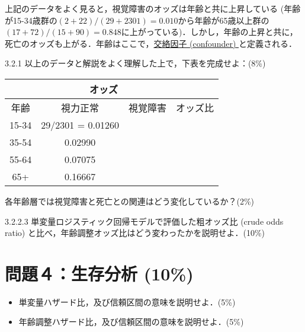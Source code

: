 \documentclass[11pt,]{problemset}
\providecommand{\tightlist}{%
  \setlength{\itemsep}{0pt}\setlength{\parskip}{0pt}}
\begin{document}
上記のデータをよく見ると，視覚障害のオッズは年齢と共に上昇している
(年齢が15-34歳群の\((2 + 22) / (29 + 2301) = 0.010\)から年齢が65歳以上群の\((17+72)/(15+90) = 0.848\)に上がっている)．しかし，年齢の上昇と共に，死亡のオッズも上がる．年齢はここで，\underline{交絡因子 (confounder) }と定義される．

3.2.1 以上のデータと解説をよく理解した上で，下表を完成せよ：(8\%)

\begin{center}
\begin{tabular}{|c|c|c|c|}
\hline
      & \multicolumn{2}{c|}{オッズ}    &        \\ \hline
年齢    & 視力正常              & 視覚障害    & オッズ比   \\ \hline
15-34 & 29/2301 = 0.01260 &   &   \\ \hline
35-54 & 0.02990           &  &  \\ \hline
55-64 & 0.07075           &  &  \\ \hline
65+   & 0.16667           &  &  \\ \hline
\end{tabular}
\end{center}

各年齢層では視覚障害と死亡との関連はどう変化しているか？(2\%)

\newpage

3.2.2.3 単変量ロジスティック回帰モデルで評価した粗オッズ比 (crude odds
ratio) と比べ，年齢調整オッズ比はどう変わったかを説明せよ．(10\%)

\bigskip\bigskip\bigskip\bigskip\bigskip
\bigskip\bigskip\bigskip\bigskip\bigskip
\bigskip\bigskip\bigskip\bigskip\bigskip

\hypertarget{-10}{%
\section{問題４：生存分析 (10\%)}\label{-10}}

\begin{itemize}
\tightlist
\item
  単変量ハザード比，及び信頼区間の意味を説明せよ．(5\%)
\end{itemize}

\bigskip\bigskip\bigskip\bigskip\bigskip
\bigskip\bigskip\bigskip\bigskip\bigskip
\bigskip\bigskip\bigskip\bigskip\bigskip

\begin{itemize}
\tightlist
\item
  年齢調整ハザード比，及び信頼区間の意味を説明せよ．(5\%)
\end{itemize}
\end{document}
